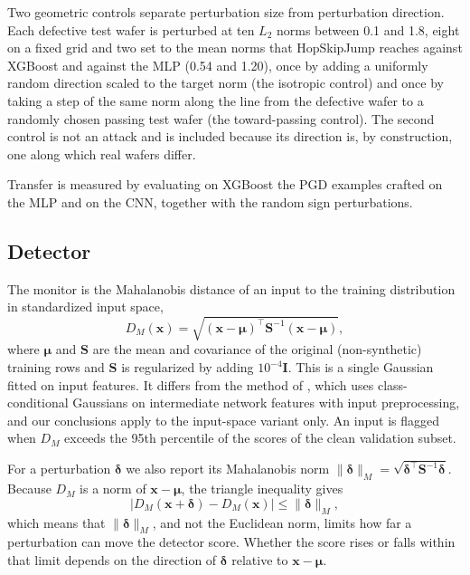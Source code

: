 \documentclass[preprint,12pt,authoryear]{elsarticle}
\begin{document}
Two geometric controls separate perturbation size from perturbation direction. Each defective test wafer is perturbed at ten $L_2$ norms between 0.1 and 1.8, eight on a fixed grid and two set to the mean norms that HopSkipJump reaches against XGBoost and against the MLP (0.54 and 1.20), once by adding a uniformly random direction scaled to the target norm (the isotropic control) and once by taking a step of the same norm along the line from the defective wafer to a randomly chosen passing test wafer (the toward-passing control). The second control is not an attack and is included because its direction is, by construction, one along which real wafers differ.

Transfer is measured by evaluating on XGBoost the PGD examples crafted on the MLP and on the CNN, together with the random sign perturbations.

\subsection{Detector}
The monitor is the Mahalanobis distance of an input to the training distribution in standardized input space,
\begin{equation}
D_M(\mathbf{x}) = \sqrt{(\mathbf{x} - \boldsymbol{\mu})^\top \mathbf{S}^{-1}(\mathbf{x} - \boldsymbol{\mu})},
\end{equation}
where $\boldsymbol{\mu}$ and $\mathbf{S}$ are the mean and covariance of the original (non-synthetic) training rows and $\mathbf{S}$ is regularized by adding $10^{-4}\mathbf{I}$. This is a single Gaussian fitted on input features. It differs from the method of \citet{lee2018mahal}, which uses class-conditional Gaussians on intermediate network features with input preprocessing, and our conclusions apply to the input-space variant only. An input is flagged when $D_M$ exceeds the 95th percentile of the scores of the clean validation subset.

For a perturbation $\boldsymbol{\delta}$ we also report its Mahalanobis norm $\|\boldsymbol{\delta}\|_M = \sqrt{\boldsymbol{\delta}^\top \mathbf{S}^{-1} \boldsymbol{\delta}}$. Because $D_M$ is a norm of $\mathbf{x}-\boldsymbol{\mu}$, the triangle inequality gives
\begin{equation}
\left| D_M(\mathbf{x}+\boldsymbol{\delta}) - D_M(\mathbf{x}) \right| \le \|\boldsymbol{\delta}\|_M ,
\label{eq:bound}
\end{equation}
which means that $\|\boldsymbol{\delta}\|_M$, and not the Euclidean norm, limits how far a perturbation can move the detector score. Whether the score rises or falls within that limit depends on the direction of $\boldsymbol{\delta}$ relative to $\mathbf{x}-\boldsymbol{\mu}$.
\end{document}
